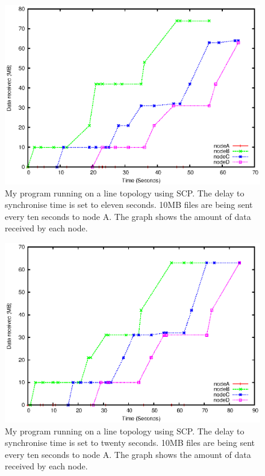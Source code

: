 \documentclass[12pt]{article}
\begin{document}
\newpage
\begin{figure}[ht!]
\centering
\includegraphics[height=0.38\textheight]{images/line-scp-10-11.eps}
\caption{My program running on a line topology using SCP.
The delay to synchronise time is set to eleven seconds.
10MB files are being sent every ten seconds to node A. The graph
shows the amount of data received by each node.}
\label{fig:line_scp_10_11}
\end{figure}


\begin{figure}[hb!]
\centering
\includegraphics[height=0.38\textheight]{images/line-scp-10-20.eps}
\caption{My program running on a line topology using SCP.
The delay to synchronise time is set to twenty seconds.
10MB files are being sent every ten seconds to node A. The graph
shows the amount of data received by each node.}
\label{fig:line_scp_10_20}
\end{figure}
\newpage
\end{document}
